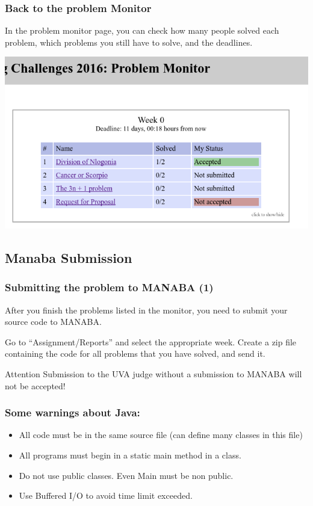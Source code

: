 \documentclass{beamer}
\begin{document}
\begin{frame}
  \frametitle{Back to the problem Monitor}

  In the problem monitor page, you can check how many people solved
  each problem, which problems you still have to solve, and the
  deadlines.

  \begin{center}
    \includegraphics[width=.7\textwidth]{../img/monitorpage2}
  \end{center}
\end{frame}

\subsection{Manaba Submission}
\begin{frame}
  \frametitle{Submitting the problem to MANABA (1)}
  
  After you finish the problems listed in the monitor, you need to
  submit your source code to MANABA.

  Go to ``Assignment/Reports'' and select the appropriate week. Create
  a zip file containing the code for all problems that you have
  solved, and send it.

  \begin{alertblock}{Attention}
  Submission to the UVA judge without a submission to MANABA will not
  be accepted!
  \end{alertblock}
\end{frame}

\begin{frame}
  \frametitle{Some warnings about Java:}

  \begin{itemize}
  \item All code must be in the same source file (can define many classes in this file)

    \medskip

  \item All programs must begin in a static main method in a  class.

    \medskip

  \item Do not use public classes. Even Main must be non public.

    \medskip

  \item Use Buffered I/O to avoid time limit exceeded.
  \end{itemize}
\end{frame}
\end{document}
